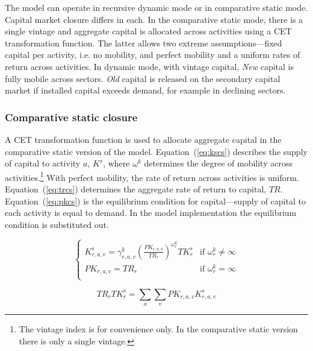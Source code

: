\documentclass[11pt,letterpaper]{report}
\begin{document}
The model can operate in recursive dynamic mode or in comparative static mode.
Capital market closure differs in each. In the comparative static mode, there
is a single vintage and aggregate capital is allocated across activities using
a CET transformation function. The latter allows two extreme assumptions---fixed
capital per activity, i.e. no mobility, and perfect mobility and a uniform rates
of return across activities. In dynamic mode, with vintage capital, \emph{New}
capital is fully mobile across sectors. \emph{Old} capital is released on the
secondary capital market if installed capital exceeds demand, for example in
declining sectors.

\subsubsection{Comparative static closure}

A CET transformation function is used to allocate aggregate capital in the
comparative static version of the model. Equation~(\ref{eq:kscs}) describes the
supply of capital to activity $a$, $K^s$, where $\omega^k$ determines the degree
of mobility across activities.\footnote{The vintage index is for convenience
only. In the comparative static version there is only a single vintage.} With
perfect mobility, the rate of return across activities is uniform.
Equation~(\ref{eq:trcs}) determines the aggregate rate of return to capital,
$\mathit{TR}$. Equation~(\ref{eq:pkcs}) is the equilibrium condition for
capital---supply of capital to each activity is equal to demand. In the model
implementation the equilibrium condition is substituted out.

\begin{equation}
\label{eq:kscs}
\begin{cases}
\displaystyle K^s_{r,a,v} =
   \gamma^k_{r,a,v}
   \left( \frac{\mathit{PK}_{r,a,v}} {\mathit{TR}_r}
   \right)^{\omega^k_r}
   \mathit{TK}^s_r
& \textrm{if } \omega^k_{r} \ne \infty \\
\displaystyle \mathit{PK}_{r,a,v} =
   \mathit{TR}_r
& \textrm{if } \omega^k_{r} = \infty \\
\end{cases}
\end{equation}

\begin{equation}
\label{eq:trcs}
\mathit{TR}_r \mathit{TK}^s_r =
   \sum_a {\sum_v {\mathit{PK}_{r,a,v} K^s_{r,a,v} } }
\end{equation}
\end{document}
